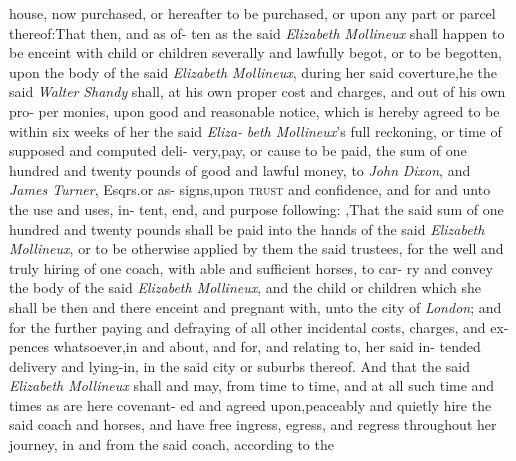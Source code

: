 \documentclass{article}
\begin{document}
\lqq house, now purchased, or hereafter to\break
\lqq be purchased, or upon any part or\break
\lqq parcel thereof:\tsk  That then, and as of-\break
\lqq ten as the said \textit{Elizabeth Mollineux} shall\break
\lqq happen to be enceint with child or\break
\lqq children severally and lawfully begot,\break
\lqq or to be begotten, upon the body of\break
\lqq the said \textit{Elizabeth Mollineux}, during her\break
\lqq said coverture,\tsk  he the said \textit{Walter}\break
\lqq \textit{Shandy} shall, at his own proper cost\break
\lqq and charges, and out of his own pro-\break
\lqq per monies, upon good and reasonable\break
\lqq notice, which is hereby agreed to be 
\lqq within six weeks of her the said \textit{Eliza-}\break
\lqq \textit{beth Mollineux}’s full reckoning, or\break
\lqq time of supposed and computed deli-\break
\lqq very,\tsk  pay, or cause to be paid, the\break
\lqq sum of one hundred and twenty pounds\break
\lqq of good and lawful money, to \textit{John}\break
\lqq \textit{Dixon}, and \textit{James Turner}, Esqrs.\@ or as-\break
\lqq signs,\tsk  upon \textsc{trust} and confidence,\break
\lqq and for and unto the use and uses, in-\break
\lqq tent, end, and purpose following:\tsk\break
\lqq {}\hbox{},\tsk  That the said sum\break
\lqq of one hundred and twenty pounds\break
\lqq shall be paid into the hands of the said\break
\lqq \textit{Elizabeth Mollineux}, or to be otherwise\break
\lqq applied by them the said trustees, for\break
\lqq the well and truly hiring of one coach,\break
\lqq with able and sufficient horses, to car-\break
\lqq ry and convey the body of the said\break
\lqq \textit{Elizabeth Mollineux}, and the child or\break
\lqq children which she shall be then and\break
\lqq there enceint and pregnant with,\tsk{}
\lqq unto the city of \textit{London}; and for the\break
\lqq further paying and defraying of all\break
\lqq other incidental costs, charges, and ex-\break
\lqq pences whatsoever,\tsk  in and about,\break
\lqq and for, and relating to, her said in-\break
\lqq tended delivery and lying-in, in the\break
\lqq said city or suburbs thereof. And that\break
\lqq the said \textit{Elizabeth Mollineux} shall and\break
\lqq may, from time to time, and at all such\break
\lqq time and times as are here covenant-\break
\lqq ed and agreed upon,\tsk  peaceably and\break
\lqq quietly hire the said coach and horses,\break
\lqq and have free ingress, egress, and\break
\lqq regress throughout her journey, in and\break
\lqq from the said coach, according to the\break
\end{document}
